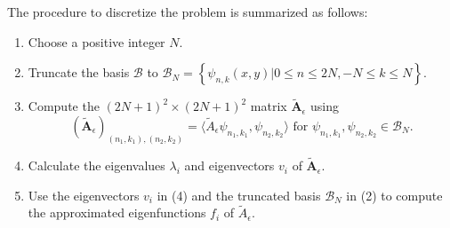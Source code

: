 \documentclass[1 [leqno, 11pt]{amsart}
\numberwithin{equation}{section}
\let\ep=\epsilon
\begin{document}
\begin{CJK*}{GBK}{song}
The procedure to discretize the problem is summarized as follows:
\begin{enumerate}
 \item Choose a positive integer $N$.
 \item Truncate the basis $\mathcal{B}$ to $\mathcal{B}_N = \left\{\psi_{n,k}(x,y) | 0\leq n \leq2N,  -N \leq k \leq N\right\}$.
 \item Compute the $(2N + 1)^2 \times (2N+1)^2$ matrix $\mathbf{\tilde{A}}_\ep$ using
 $$(\mathbf{\tilde{A}}_\ep)_{(n_1, k_1), (n_2, k_2)} = \langle\tilde{A}_\ep \psi_{n_1, k_1}, \psi_{n_2, k_2}\rangle \text{ for } \psi_{n_1, k_1},  \psi_{n_2, k_2} \in \mathcal{B}_N.$$
 \item Calculate the eigenvalues $\lambda_i$ and eigenvectors $v_i$ of $\mathbf{\tilde{A}}_\ep$.
 \item Use the eigenvectors $v_i$ in (4) and the truncated basis $\mathcal{B}_N$ in (2) to compute the approximated eigenfunctions $f_i$ of $\tilde{A}_\ep$.
 \end{enumerate}



\end{CJK*}
\end{document}

